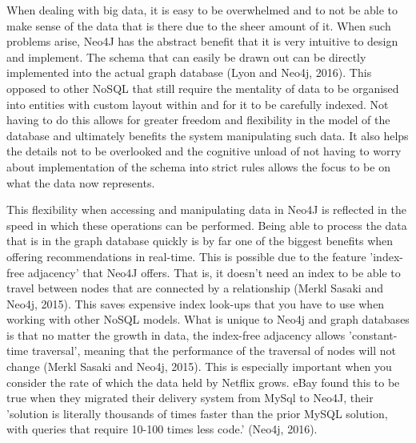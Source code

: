 \documentclass[a4paper]{article}
\begin{document}
When dealing with big data, it is easy to be overwhelmed and to not be able to make sense of the data that is there due to the sheer amount of it. When such problems arise, Neo4J has the abstract benefit that it is very intuitive to design and implement. The schema that can easily be drawn out can be directly implemented into the actual graph database (Lyon and Neo4j, 2016). This opposed to other NoSQL that still require the mentality of data to be organised into entities with custom layout within and for it to be carefully indexed. Not having to do this allows for greater freedom and flexibility in the model of the database and ultimately benefits the system manipulating such data. It also helps the details not to be overlooked and the cognitive unload of not having to worry about implementation of the schema into strict rules allows the focus to be on what the data now represents.\par

This flexibility when accessing and manipulating data in Neo4J is reflected in the speed in which these operations can be performed. Being able to process the data that is in the graph database quickly is by far one of the biggest benefits when offering recommendations in real-time. This is possible due to the feature 'index-free adjacency' that Neo4J offers. That is, it doesn't need an index to be able to travel between nodes that are connected by a relationship (Merkl Sasaki and Neo4j, 2015). This saves expensive index look-ups that you have to use when working with other NoSQL models. What is unique to Neo4j and graph databases is that no matter the growth in data, the index-free adjacency allows 'constant-time traversal', meaning that the performance of the traversal of nodes will not change (Merkl Sasaki and Neo4j, 2015). This is especially important when you consider the rate of which the data held by Netflix grows. eBay found this to be true when they migrated their delivery system from MySql to Neo4J, their 'solution is literally thousands of times faster than the prior MySQL solution, with queries that require 10-100 times less code.' (Neo4j, 2016). \par
\end{document}
